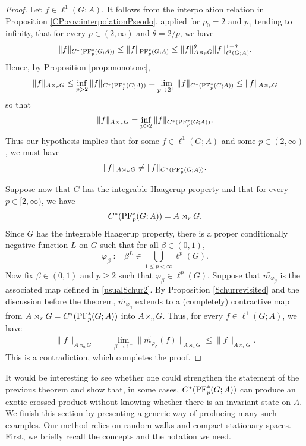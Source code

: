 \documentclass[12pt]{amsart}
\theoremstyle{definition}
\theoremstyle{remark}
\numberwithin{equation}{section}
\begin{document}
\begin{proof}
Let $f\in \ell^1(G;A)$. It follows from the interpolation relation in Proposition \ref{CP:cov:interpolationPseodo}, applied for $p_0=2$ and $p_1$ tending to infinity, that for every $p\in (2,\infty)$ and $\theta=2/p$, we have
  $$\|f\|_{C^*(\textup{PF}^*_p(G;A))}\leq \|f\|_{\textup{PF}^*_p(G;A)}\leq \|f\|^\theta_{A\rtimes_r G} \|f\|^{1-\theta}_{\ell^1(G;A)}.$$
  Hence, by Proposition \ref{prop:monotone},
  $$\|f\|_{A\rtimes_r G} \leq \inf_{p> 2} \|f\|_{C^*(\textup{PF}^*_{p}(G;A))}=\lim_{p\to 2^+} \|f\|_{C^*(\textup{PF}^*_{p}(G;A))}\leq \|f\|_{A\rtimes_r G}$$
  so that
  $$\|f\|_{A\rtimes_r G} = \inf_{p> 2} \|f\|_{C^*(\textup{PF}^*_{p}(G;A))}.$$
  Thus our hypothesis implies that for some $f\in \ell^1(G;A)$ and some $p\in (2,\infty)$, we must have
  \begin{align*}
   \|f\|_{A\rtimes_u G}\neq \|f\|_{C^*(\textup{PF}^*_{p}(G;A))}.
  \end{align*}


 Suppose now that $G$ has the integrable Haagerup property and that for every $p\in [2,\infty)$, we have
  $$C^*(\textup{PF}^*_p(G;A))= A\rtimes_r G.$$
  Since $G$ has the integrable Haagerup property, there is a proper conditionally negative function $L$ on $G$ such that for all $\beta\in (0,1)$,
$$\varphi_\beta:=\beta^L\in \bigcup_{1\leq p<\infty}\ell^p(G).$$ 
Now fix $\beta\in (0,1)$ and $p\geq 2$ such that $\varphi_\beta\in \ell^p(G)$. Suppose that $\widetilde{m_{\varphi_\beta}}$ is the associated map defined in \eqref{usualSchur2}. By Proposition \ref{Schurrevisited} and the discussion before the theorem, $\widetilde{m_{\varphi_\beta}}$  extends to a (completely) contractive map from $A\rtimes_r G=C^*(\textup{PF}^*_p(G;A))$ into $A\rtimes_u G$. Thus, for every $f\in \ell^1(G;A)$, we have
  \begin{align*}
    \|f\|_{A\rtimes_u G} &= \lim_{\beta\to 1^-} \|\widetilde{m_{\varphi_\beta}}(f)\|_{A\rtimes_u G}
\leq  \|f\|_{A\rtimes_r G}.
  \end{align*}
  This is a contradiction, which completes the proof.
\end{proof}

It would be interesting to see whether one could strengthen the statement of the previous theorem and show that, in some cases, $C^*(\textup{PF}^*_p(G;A))$ can produce an exotic crossed product without knowing whether there is an invariant state on $A$. We finish this section by presenting a generic way of producing many such examples. Our method relies on random walks and compact stationary spaces. First, we briefly recall the concepts and the notation we need.
\end{document}
